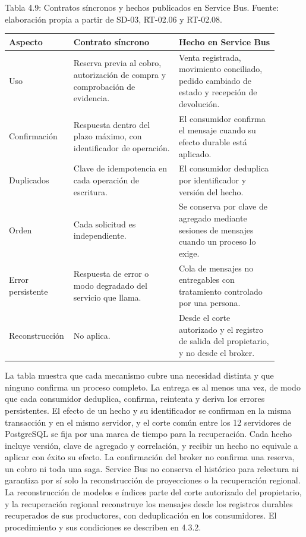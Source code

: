 \documentclass[11pt]{article}
\begin{document}
Tabla 4.9: Contratos síncronos y hechos publicados en Service Bus. Fuente: elaboración propia a partir de SD-03, RT-02.06 y RT-02.08.\par\nopagebreak
\begin{longtable}{@{}p{0.16\linewidth}p{0.38\linewidth}p{0.36\linewidth}@{}}
\toprule Aspecto & Contrato síncrono & Hecho en Service Bus \\
\midrule\endhead\bottomrule\endlastfoot
Uso & Reserva previa al cobro, autorización de compra y comprobación de evidencia. & Venta registrada, movimiento conciliado, pedido cambiado de estado y recepción de devolución. \\
Confirmación & Respuesta dentro del plazo máximo, con identificador de operación. & El consumidor confirma el mensaje cuando su efecto durable está aplicado. \\
Duplicados & Clave de idempotencia en cada operación de escritura. & El consumidor deduplica por identificador y versión del hecho. \\
Orden & Cada solicitud es independiente. & Se conserva por clave de agregado mediante sesiones de mensajes cuando un proceso lo exige. \\
Error persistente & Respuesta de error o modo degradado del servicio que llama. & Cola de mensajes no entregables con tratamiento controlado por una persona. \\
Reconstrucción & No aplica. & Desde el corte autorizado y el registro de salida del propietario, y no desde el broker. \\
\end{longtable}

La tabla muestra que cada mecanismo cubre una necesidad distinta y que ninguno confirma un proceso completo. La entrega es al menos una vez, de modo que cada consumidor deduplica, confirma, reintenta y deriva los errores persistentes. El efecto de un hecho y su identificador se confirman en la misma transacción y en el mismo servidor, y el corte común entre los 12 servidores de PostgreSQL se fija por una marca de tiempo para la recuperación. Cada hecho incluye versión, clave de agregado y correlación, y recibir un hecho no equivale a aplicar con éxito su efecto. La confirmación del broker no confirma una reserva, un cobro ni toda una saga. Service Bus no conserva el histórico para relectura ni garantiza por sí solo la reconstrucción de proyecciones o la recuperación regional. La reconstrucción de modelos e índices parte del corte autorizado del propietario, y la recuperación regional reconstruye los mensajes desde los registros durables recuperados de sus productores, con deduplicación en los consumidores. El procedimiento y sus condiciones se describen en 4.3.2.
\end{document}
